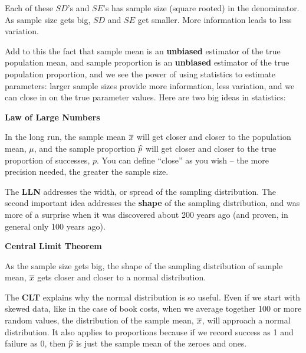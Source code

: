   Each of these $SD$'s and $SE$'s has sample size (square
  rooted) in the denominator.  As sample size gets big, $SD$ and $SE$ get
  smaller. More information leads to less variation.

  Add to this the fact that sample mean is an {\bf unbiased} estimator
  of the true population mean, and sample proportion is an {\bf
  unbiased} estimator of the true population proportion, and we see
  the power of using statistics to estimate parameters: larger sample
  sizes provide more information, less variation, and we can close in
  on the true parameter values. Here are two big ideas in statistics:

  \begin{center}
    {\large \bf  Law of Large Numbers}\vspace{.2cm}
\\
 \begin{fmpage}{.9\linewidth}
  In the long run, the sample mean $\overline{x}$ will get closer and closer to the
   population mean, $\mu$, and the sample proportion $\widehat{p}$ will get
   closer and closer to the true proportion of successes, $p$.  You can define
   ``close'' as you wish -- the more precision needed, the greater the
   sample size.
 \end{fmpage}
  \end{center}
 
  The {\bf LLN} addresses the width, or spread of the sampling
  distribution. The second important idea addresses the {\bf shape} of
  the sampling distribution, and was more of a surprise when it was
  discovered about 200 years ago (and proven, in general only 100
  years ago).

  \begin{center}
    {\large \bf  Central Limit Theorem} \vspace{.2cm}
\\
\begin{fmpage}{.9\linewidth}
  As the sample size gets big, the shape
  of the sampling distribution of sample mean, $\overline{x}$ gets closer and
  closer to a normal distribution.
\end{fmpage}
  \end{center}

The {\bf CLT} explains why the normal distribution is so useful.  Even if we
start with skewed data, like in the case of book costs, when we
average together 100 or more random values, the distribution of the
sample mean, $\overline{x}$,  will approach a normal distribution.  It also
applies to proportions because if we record success as 1 and failure as
0, then $\widehat{p}$ is just the sample mean of the zeroes and ones.


